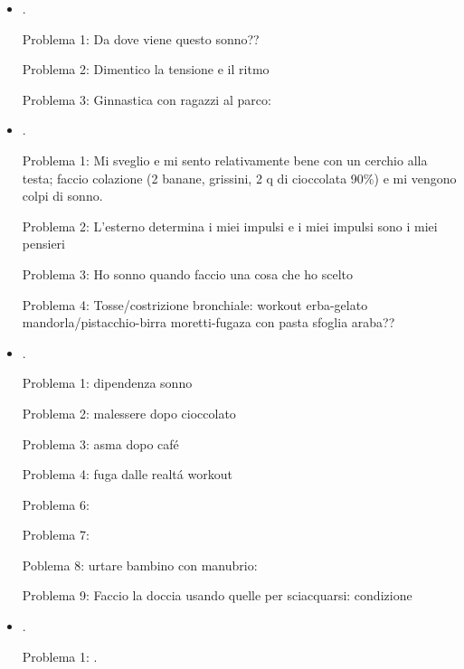 \begin{itemize}
Problema 2: Condizione che mi porta a ''cercare una gelateria''

Problema 3: Ho bisogno di uno schema per workout

Problema 4: Coazione vs memoria ed elasticit\'a

\item {}.

Problema 1: Da dove viene questo sonno??

Problema 2: Dimentico la tensione e  il ritmo

Problema 3: Ginnastica con ragazzi al parco: 

\item {}.

Problema 1: Mi sveglio e mi sento relativamente bene con un cerchio alla testa; faccio colazione (2 banane, grissini, 2 q di cioccolata 90\%) e mi vengono colpi di sonno.

Problema 2: L'esterno determina i miei impulsi e i miei impulsi sono i miei pensieri

Problema 3: Ho sonno quando faccio una cosa che ho scelto

Problema 4: Tosse/costrizione bronchiale: workout erba-gelato mandorla/pistacchio-birra moretti-fugaza con pasta sfoglia araba??

\item {}.

Problema 1: dipendenza sonno

Problema 2: malessere dopo cioccolato

Problema 3: asma dopo caf\'e

Problema 4: fuga dalle realt\'a workout

Problema 6: 

Problema 7: 

Poblema 8: urtare bambino con manubrio: 

Problema 9: Faccio la doccia usando quelle per sciacquarsi: condizione 

\item {}.

Problema 1: .


\end{itemize}
